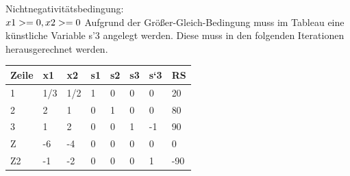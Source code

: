 Nichtnegativitätsbedingung:\\
\begin{math}
x1 >= 0, x2 >= 0\\
\end{math}
Aufgrund der Größer-Gleich-Bedingung muss im Tableau eine künstliche Variable s’3 angelegt werden. Diese muss in den folgenden Iterationen herausgerechnet werden.\\
\begin{table}[!ht]
\begin{tabular}{|l|l|l|l|l|l|l|l|}
\hline
\rowcolor[HTML]{C0C0C0} 
Zeile                      & x1                          & x2                          & s1                        & s2                        & s3                        & s`3 & RS  \\ \hline
\cellcolor[HTML]{C0C0C0}1  & \cellcolor[HTML]{FFFFFF}1/3 & \cellcolor[HTML]{CBCEFB}1/2 & \cellcolor[HTML]{FFFFFF}1 & \cellcolor[HTML]{FFFFFF}0 & \cellcolor[HTML]{FFFFFF}0 & 0   & 20  \\ \hline
\cellcolor[HTML]{C0C0C0}2  & \cellcolor[HTML]{FFFFFF}2   & \cellcolor[HTML]{FFFFFF}1   & \cellcolor[HTML]{FFFFFF}0 & \cellcolor[HTML]{FFFFFF}1 & \cellcolor[HTML]{FFFFFF}0 & 0   & 80  \\ \hline
\cellcolor[HTML]{C0C0C0}3  & \cellcolor[HTML]{FFFFFF}1   & \cellcolor[HTML]{FFFFFF}2   & \cellcolor[HTML]{FFFFFF}0 & \cellcolor[HTML]{FFFFFF}0 & \cellcolor[HTML]{FFFFFF}1 & -1  & 90  \\ \hline
\cellcolor[HTML]{C0C0C0}Z  & \cellcolor[HTML]{FFFFFF}-6  & \cellcolor[HTML]{FFFFFF}-4  & \cellcolor[HTML]{FFFFFF}0 & \cellcolor[HTML]{FFFFFF}0 & \cellcolor[HTML]{FFFFFF}0 & 0   & 0   \\ \hline
\cellcolor[HTML]{C0C0C0}Z2 & -1                          & -2                          & 0                         & 0                         & 0                         & 1   & -90 \\ \hline
\end{tabular}
\end{table}
\\
